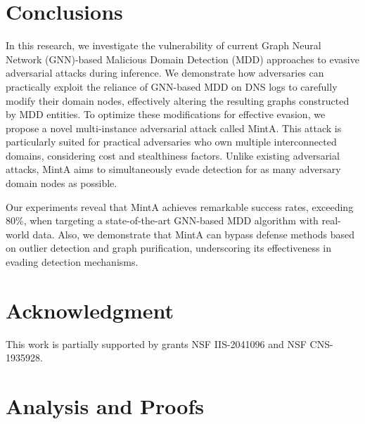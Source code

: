 \documentclass[conference,compsoc]{IEEEtran}
\begin{document}
\section{Conclusions}
\label{Section8}
\par In this research, we investigate the vulnerability of current Graph Neural Network (GNN)-based Malicious Domain Detection (MDD) approaches to evasive adversarial attacks during inference. We demonstrate how adversaries can practically exploit the reliance of GNN-based MDD on DNS logs to carefully modify their domain nodes, effectively altering the resulting graphs constructed by MDD entities.
To optimize these modifications for effective evasion, we propose a novel multi-instance adversarial attack called MintA. This attack is particularly suited for practical adversaries who own multiple interconnected domains, considering cost and stealthiness factors. Unlike existing adversarial attacks, MintA aims to simultaneously evade detection for as many adversary domain nodes as possible.

Our experiments reveal that MintA achieves remarkable success rates, exceeding 80\%, when targeting a state-of-the-art GNN-based MDD algorithm with real-world data. Also, we demonstrate that MintA can bypass defense methods based on outlier detection and graph purification, underscoring its effectiveness in evading detection mechanisms.



\section*{Acknowledgment}
This work is partially supported by grants NSF IIS-2041096 and NSF CNS-1935928.












\appendices
\section{Analysis and Proofs}
\label{appendixA}
\end{document}
